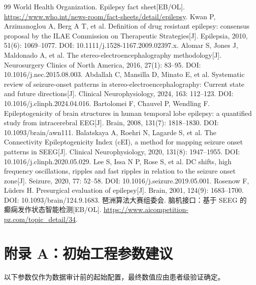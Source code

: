 \clearpage
{}
\begin{thebibliography}{99}
 World Health Organization. Epilepsy fact sheet[EB/OL]. \url{https://www.who.int/news-room/fact-sheets/detail/epilepsy}.
 Kwan P, Arzimanoglou A, Berg A T, et al. Definition of drug resistant epilepsy: consensus proposal by the ILAE Commission on Therapeutic Strategies[J]. Epilepsia, 2010, 51(6): 1069--1077. DOI: 10.1111/j.1528-1167.2009.02397.x.
 Alomar S, Jones J, Maldonado A, et al. The stereo-electroencephalography methodology[J]. Neurosurgery Clinics of North America, 2016, 27(1): 83--95. DOI: 10.1016/j.nec.2015.08.003.
 Abdallah C, Mansilla D, Minato E, et al. Systematic review of seizure-onset patterns in stereo-electroencephalography: Current state and future directions[J]. Clinical Neurophysiology, 2024, 163: 112--123. DOI: 10.1016/j.clinph.2024.04.016.
 Bartolomei F, Chauvel P, Wendling F. Epileptogenicity of brain structures in human temporal lobe epilepsy: a quantified study from intracerebral EEG[J]. Brain, 2008, 131(7): 1818--1830. DOI: 10.1093/brain/awn111.
 Balatskaya A, Roehri N, Lagarde S, et al. The Connectivity Epileptogenicity Index (cEI), a method for mapping seizure onset patterns in SEEG[J]. Clinical Neurophysiology, 2020, 131(8): 1947--1955. DOI: 10.1016/j.clinph.2020.05.029.
 Lee S, Issa N P, Rose S, et al. DC shifts, high frequency oscillations, ripples and fast ripples in relation to the seizure onset zone[J]. Seizure, 2020, 77: 52--58. DOI: 10.1016/j.seizure.2019.05.001.
 Rosenow F, L{\"u}ders H. Presurgical evaluation of epilepsy[J]. Brain, 2001, 124(9): 1683--1700. DOI: 10.1093/brain/124.9.1683.
 琶洲算法大赛组委会. 脑机接口：基于 SEEG 的癫痫发作状态智能检测[EB/OL]. \url{https://www.aicompetition-pz.com/topic_detail/34}.
\end{thebibliography}

\clearpage
\appendix
\setcounter{section}{1}
\setcounter{table}{0}
\section*{附录 A：初始工程参数建议}

以下参数仅作为数据审计前的起始配置，最终数值应由患者级验证确定。

